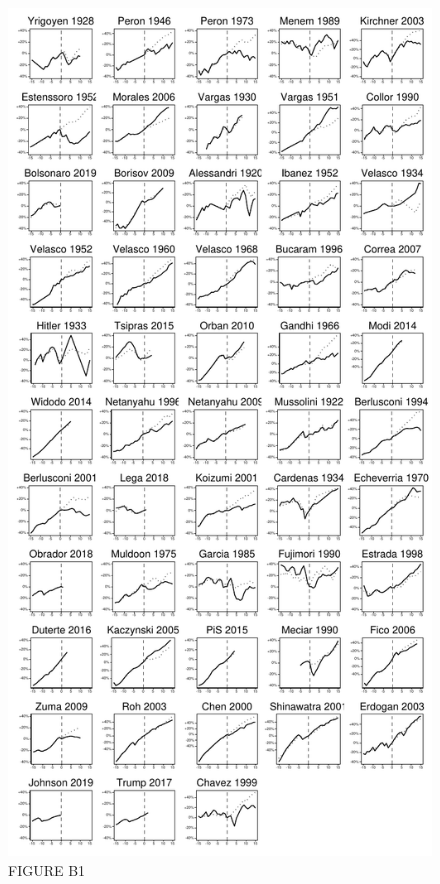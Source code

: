 \documentclass{article}
\begin{document}
\begin{figure}	
	\caption{FIGURE B1} 
		\includegraphics[scale=0.7]{FigureB1}\centering	
\end{figure}
\end{document}
